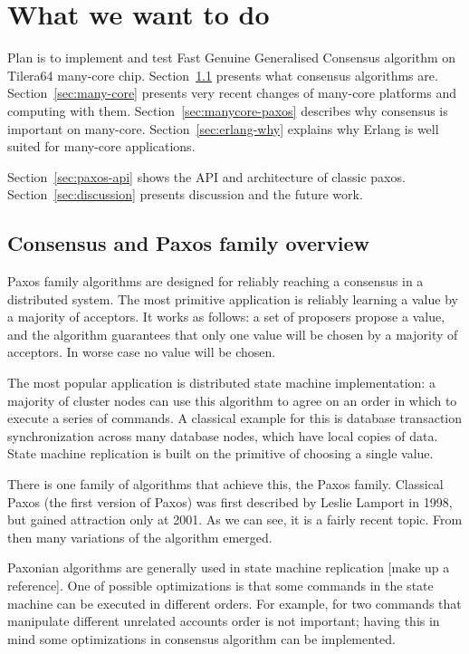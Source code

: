 \documentclass[english,11pt]{article}
\begin{document}
\section{What we want to do}

Plan is to implement and test Fast Genuine Generalised Consensus algorithm on
Tilera64 many-core chip. Section~\ref{sec:paxos-family} presents what consensus
algorithms are. Section~\ref{sec:many-core} presents very recent changes of
many-core platforms and computing with them. Section~\ref{sec:manycore-paxos}
describes why consensus is important on many-core. Section~\ref{sec:erlang-why}
explains why Erlang is well suited for many-core applications.

Section~\ref{sec:paxos-api} shows the API and architecture of classic paxos.
Section~\ref{sec:discussion} presents discussion and the future work.

\subsection{Consensus and Paxos family overview}
\label{sec:paxos-family}

Paxos family algorithms are designed for reliably reaching a consensus in a
distributed system. The most primitive application is reliably learning a value
by a majority of acceptors. It works as follows: a set of proposers propose a
value, and the algorithm guarantees that only one value will be chosen by a
majority of acceptors. In worse case no value will be chosen.

The most popular application is distributed state machine implementation: a
majority of cluster nodes can use this algorithm to agree on an order in which
to execute a series of commands. A classical example for this is database
transaction synchronization across many database nodes, which have local copies
of data. State machine replication is built on the primitive of choosing a
single value.

There is one family of algorithms that achieve this, the Paxos family.
Classical Paxos (the first version of Paxos) was first described by Leslie
Lamport in 1998\cite{classic-paxos}, but gained attraction only at
2001\cite{paxos-simple}. As we can see, it is a fairly recent topic. From then
many variations of the algorithm emerged.

Paxonian algorithms are generally used in state machine replication [make up a
reference]. One of possible optimizations is that some commands in the state
machine can be executed in different orders. For example, for two commands that
manipulate different unrelated accounts order is not important; having this in
mind some optimizations in consensus algorithm can be implemented.
\end{document}
